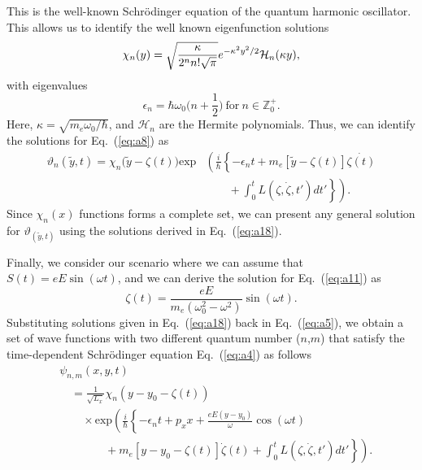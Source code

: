 \documentclass[
 reprint,
 amsmath,amssymb,
 aps,
 prb,
]{revtex4-2}
\begin{document}
\begin{appendix}
This is the well-known Schrödinger equation of the quantum harmonic oscillator.
This allows us to identify the well known eigenfunction solutions \cite{griffiths18,shankar94}
\begin{equation} \label{eq:a16}
  \chi_n(y) =
  \sqrt{\frac{\kappa}{2^{n}n!\sqrt{\pi}}}
  e^{-\kappa^2 y^2/2}
  \mathcal{H}_n \qty(\kappa y),
\end{equation}
with eigenvalues
\begin{equation} \label{eq:a17}
  \epsilon_n = \hbar \omega_0 \bigg(n + \frac{1}{2}\bigg)
  ~\text{for}~
  n \in \mathbb{Z}^{+}_0.
\end{equation}
Here, $\kappa = \sqrt{{m_e \omega_0}/{\hbar}}$, and $\mathcal{H}_n$ are the Hermite polynomials.
Thus, we can identify the solutions for Eq.~(\ref{eq:a8}) as
\begin{equation} \label{eq:a18}
  \begin{aligned}
    \vartheta_n(\tilde{y},t) = \chi_n\bm{(}\tilde{y} - \zeta(t)\bm{)}
     \text{exp}&
     \left(
     \frac{i}{\hbar}
     \left\{
     - \epsilon_nt +
     m_e \left[\tilde{y}-\zeta(t)\right] \dot{\zeta(t)} \right. \right. \\
     & \left. \left. \qquad
     + \int_0^{t}L(\zeta,\dot{\zeta},t') dt'
     \right\}
     \right).
  \end{aligned}
\end{equation}
Since $\chi_n(x)$ functions forms a complete set, we can present any general solution for  $\vartheta_(\tilde{y},t)$ using the solutions derived in Eq.~(\ref{eq:a18}).

Finally, we consider our scenario where we can assume that $S(t) = eE\sin(\omega t)$, and we can derive the solution for Eq.~(\ref{eq:a11}) as
\begin{equation} \label{eq:a19}
  \zeta(t) = \frac{eE}{m_e(\omega_0^2 - \omega^2)}\sin(\omega t).
\end{equation}
Substituting solutions given in Eq.~(\ref{eq:a18}) back in Eq.~(\ref{eq:a5}), we obtain a set of wave functions with two different quantum number ($n$,$m$) that satisfy the time-dependent Schrödinger equation Eq.~(\ref{eq:a4}) as follows
\begin{equation} \label{eq:a20}
  \begin{aligned}
    &\psi_{n,m}(x,y,t) \\
    & \quad=  \frac{1}{\sqrt{L_x}}
    \chi_n\left(y - y_0 - \zeta(t)\right)\\
    &\qquad\times
    \text{exp}\left(
    \frac{i}{\hbar}
    \left\{- \epsilon_nt
    + p_x x
    + \frac{eE(y - y_0)}{\omega}\cos(\omega t) \right. \right. \\
    & \left. \left. \qquad\qquad +
    m_e\left[y - y_0 -\zeta(t)\right] \dot{\zeta}(t)+
    \int_0^{t}L(\zeta,\dot{\zeta},t') dt'
    \right\}
    \right).
  \end{aligned}
\end{equation}


\end{appendix}
\end{document}
